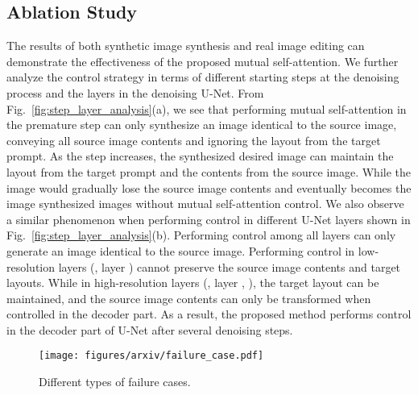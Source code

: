 \documentclass[10pt,twocolumn,letterpaper]{article}
\begin{document}
\subsection{Ablation Study}\label{sec:ablation_study}
The results of both synthetic image synthesis and real image editing can demonstrate the effectiveness of the proposed mutual self-attention. We further analyze the control strategy in terms of different starting steps at the denoising process and the layers in the denoising U-Net. From Fig.~\ref{fig:step_layer_analysis}(a), we see that performing mutual self-attention in the premature step can only synthesize an image identical to the source image, conveying all source image contents and ignoring the layout from the target prompt. As the step increases, the synthesized desired image can maintain the layout from the target prompt and the contents from the source image. While the image would gradually lose the source image contents and eventually becomes the image synthesized images without mutual self-attention control. We also observe a similar phenomenon when performing control in different U-Net layers shown in Fig.~\ref{fig:step_layer_analysis}(b). Performing control among all layers can only generate an image identical to the source image. Performing control in low-resolution layers (\eg, layer ) cannot preserve the source image contents and target layouts. While in high-resolution layers (\eg, layer , ), the target layout can be maintained, and the source image contents can only be transformed when controlled in the decoder part. As a result, the proposed method performs control in the decoder part of U-Net after several denoising steps.

\begin{figure}[b]
    \centering
    \texttt{[image: figures/arxiv/failure\_case.pdf]}
    \caption{Different types of failure cases. }
    \label{fig:failure_case}
\end{figure}
\end{document}

